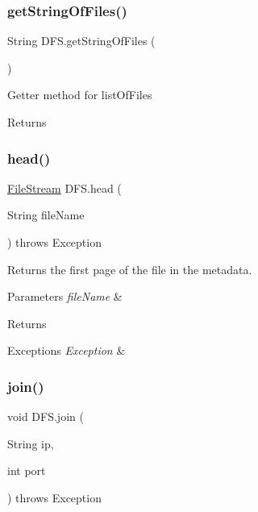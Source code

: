 \subsubsection{\texorpdfstring{get\+String\+Of\+Files()}{getStringOfFiles()}}
{\footnotesize\ttfamily String D\+F\+S.\+get\+String\+Of\+Files (\begin{DoxyParamCaption}{ }\end{DoxyParamCaption})\hspace{0.3cm}{\ttfamily [inline]}}

Getter method for list\+Of\+Files \begin{DoxyReturn}{Returns}

\end{DoxyReturn}
\mbox{\label{class_d_f_s_a73915159a4290c3832635b6c4338ff7e}} 
\subsubsection{\texorpdfstring{head()}{head()}}
{\footnotesize\ttfamily \mbox{\hyperlink{class_file_stream}{File\+Stream}} D\+F\+S.\+head (\begin{DoxyParamCaption}\item[{String}]{file\+Name }\end{DoxyParamCaption}) throws Exception\hspace{0.3cm}{\ttfamily [inline]}}

Returns the first page of the file in the metadata. 
\begin{DoxyParams}{Parameters}
{\em file\+Name} & \\
\hline
\end{DoxyParams}
\begin{DoxyReturn}{Returns}

\end{DoxyReturn}

\begin{DoxyExceptions}{Exceptions}
{\em Exception} & \\
\hline
\end{DoxyExceptions}
\mbox{\label{class_d_f_s_a21222612b26b908c380b73e1e5912a03}} 
\subsubsection{\texorpdfstring{join()}{join()}}
{\footnotesize\ttfamily void D\+F\+S.\+join (\begin{DoxyParamCaption}\item[{String}]{ip,  }\item[{int}]{port }\end{DoxyParamCaption}) throws Exception\hspace{0.3cm}{\ttfamily [inline]}}

